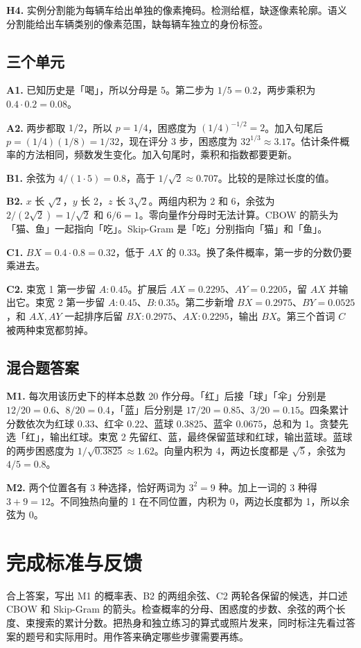 \documentclass[UTF8,a4paper,11pt]{ctexart}
\begin{document}
\textbf{H4.} 实例分割能为每辆车给出单独的像素掩码。检测给框，缺逐像素轮廓。语义分割能给出车辆类别的像素范围，缺每辆车独立的身份标签。

\subsection{三个单元}
\textbf{A1.} 已知历史是「喝」，所以分母是 5。第二步为 $1/5=0.2$，两步乘积为 $0.4\cdot0.2=0.08$。

\textbf{A2.} 两步都取 $1/2$，所以 $p=1/4$，困惑度为 $(1/4)^{-1/2}=2$。加入句尾后 $p=(1/4)(1/8)=1/32$，现在评分 3 步，困惑度为 $32^{1/3}\approx3.17$。估计条件概率的方法相同，频数发生变化。加入句尾时，乘积和指数都要更新。

\textbf{B1.} 余弦为 $4/(1\cdot5)=0.8$，高于 $1/\sqrt2\approx0.707$。比较的是除过长度的值。

\textbf{B2.} $x$ 长 $\sqrt2$，$y$ 长 2，$z$ 长 $3\sqrt2$。两组内积为 2 和 6，余弦为 $2/(2\sqrt2)=1/\sqrt2$ 和 $6/6=1$。零向量作分母时无法计算。CBOW 的箭头为「猫、鱼」一起指向「吃」。Skip-Gram 是「吃」分别指向「猫」和「鱼」。

\textbf{C1.} $BX=0.4\cdot0.8=0.32$，低于 $AX$ 的 0.33。换了条件概率，第一步的分数仍要乘进去。

\textbf{C2.} 束宽 1 第一步留 $A:0.45$。扩展后 $AX=0.2295$、$AY=0.2205$，留 $AX$ 并输出它。束宽 2 第一步留 $A:0.45$、$B:0.35$。第二步新增 $BX=0.2975$、$BY=0.0525$，和 $AX,AY$ 一起排序后留 $BX:0.2975$、$AX:0.2295$，输出 $BX$。第三个首词 $C$ 被两种束宽都剪掉。

\clearpage
\subsection{混合题答案}
\textbf{M1.} 每次用该历史下的样本总数 20 作分母。「红」后接「球」「伞」分别是 $12/20=0.6$、$8/20=0.4$，「蓝」后分别是 $17/20=0.85$、$3/20=0.15$。四条累计分数依次为红球 $0.33$、红伞 $0.22$、蓝球 $0.3825$、蓝伞 $0.0675$，总和为 1。贪婪先选「红」，输出红球。束宽 2 先留红、蓝，最终保留蓝球和红球，输出蓝球。蓝球的两步困惑度为 $1/\sqrt{0.3825}\approx1.62$。向量内积为 4，两边长度都是 $\sqrt5$，余弦为 $4/5=0.8$。

\textbf{M2.} 两个位置各有 3 种选择，恰好两词为 $3^2=9$ 种。加上一词的 3 种得 $3+9=12$。不同独热向量的 1 在不同位置，内积为 0，两边长度都为 1，所以余弦为 0。

\section{完成标准与反馈}
合上答案，写出 M1 的概率表、B2 的两组余弦、C2 两轮各保留的候选，并口述 CBOW 和 Skip-Gram 的箭头。检查概率的分母、困惑度的步数、余弦的两个长度、束搜索的累计分数。把热身和独立练习的算式或照片发来，同时标注先看过答案的题号和实际用时。用作答来确定哪些步骤需要再练。
\end{document}
